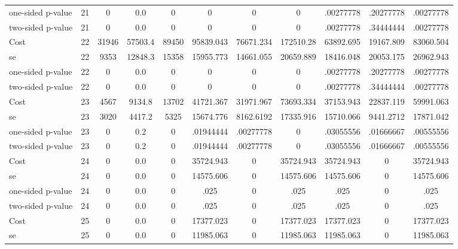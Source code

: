 \begin{tabular}{lcccccccccc}
one-sided p-value&        21 &         0 &       0.0 &         0 & 0 & 0 & 0 & .00277778 & .20277778 & .00277778 \\  
two-sided p-value&        21 &         0 &       0.0 &         0 & 0 & 0 & 0 & .00277778 & .34444444 & .00277778 \\  
Cost 			  &        22 &     31946 &   57503.4 &     89450 & 95839.043 & 76671.234 & 172510.28 & 63892.695 & 19167.809 & 83060.504 \\  
se 				 &        22 &      9353 &   12848.3 &     15358 & 15955.773 & 14661.055 & 20659.889 & 18416.048 & 20053.175 & 26962.943 \\  
one-sided p-value&        22 &         0 &       0.0 &         0 & 0 & 0 & 0 & .00277778 & .20277778 & .00277778 \\  
two-sided p-value&        22 &         0 &       0.0 &         0 & 0 & 0 & 0 & .00277778 & .34444444 & .00277778 \\  
Cost 			  &        23 &      4567 &    9134.8 &     13702 & 41721.367 & 31971.967 & 73693.334 & 37153.943 & 22837.119 & 59991.063 \\  
se 				 &        23 &      3020 &    4417.2 &      5325 & 15674.776 & 8162.6192 & 17335.916 & 15710.066 & 9441.2712 & 17871.042 \\  
one-sided p-value&        23 &         0 &       0.2 &         0 & .01944444 & .00277778 & 0 & .03055556 & .01666667 & .00555556 \\  
two-sided p-value&        23 &         0 &       0.2 &         0 & .01944444 & .00277778 & 0 & .03055556 & .01666667 & .00555556 \\  
Cost 			  &        24 &         0 &       0.0 &         0 & 35724.943 & 0 & 35724.943 & 35724.943 & 0 & 35724.943 \\  
se 				 &        24 &         0 &       0.0 &         0 & 14575.606 & 0 & 14575.606 & 14575.606 & 0 & 14575.606 \\  
one-sided p-value&        24 &         0 &       0.0 &         0 & .025 & 0 & .025 & .025 & 0 & .025 \\  
two-sided p-value&        24 &         0 &       0.0 &         0 & .025 & 0 & .025 & .025 & 0 & .025 \\  
Cost 			  &        25 &         0 &       0.0 &         0 & 17377.023 & 0 & 17377.023 & 17377.023 & 0 & 17377.023 \\  
se 				 &        25 &         0 &       0.0 &         0 & 11985.063 & 0 & 11985.063 & 11985.063 & 0 & 11985.063 \\  

\end{tabular}
